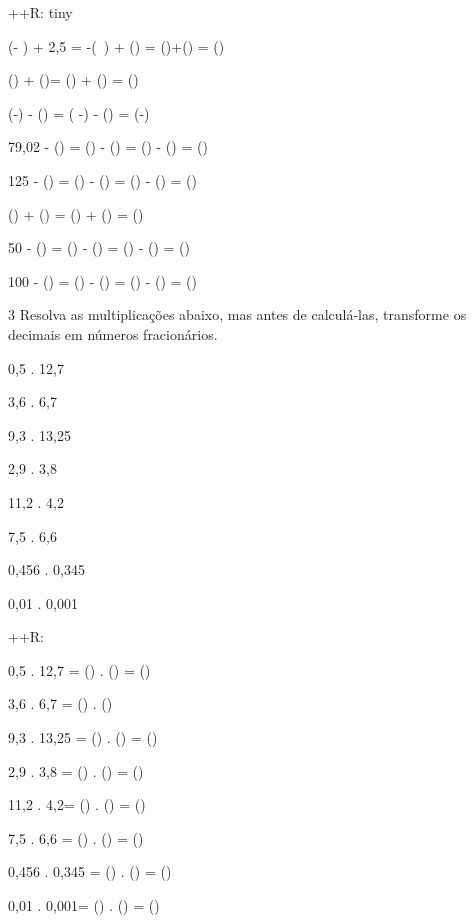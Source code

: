 ++R: tiny
\item (- ) + 2,5 = -(\ ) + () = ()+() = ()
\item () + ()= () + () = ()
\item (-) - () = ( -) - () = (-)
\item 79,02 - () = () - () = () - () = ()
\item 125 - () = () - () = () - () = ()
\item () + () = () + () = ()
\item 50 - () = () - () = () - () = ()
\item 100 - () = () - () = () - () = ()

\num{3} Resolva as multiplicações abaixo, mas antes de calculá-las,
transforme os decimais em números fracionários.
\item 0,5 . 12,7
\item 3,6 . 6,7
\item 9,3 . 13,25
\item 2,9 . 3,8
\item 11,2 . 4,2
\item 7,5 . 6,6
\item 0,456 . 0,345
\item 0,01 . 0,001

++R:
\item 0,5 . 12,7 = () . () = ()
\item 3,6 . 6,7 = () . ()
\item 9,3 . 13,25 = () . () = ()
\item 2,9 . 3,8 = () . () = ()
\item 11,2 . 4,2= () . () = ()
\item 7,5 . 6,6 = () . () = ()
\item 0,456 . 0,345 = () . () = ()
\item 0,01 . 0,001= () . () = ()

